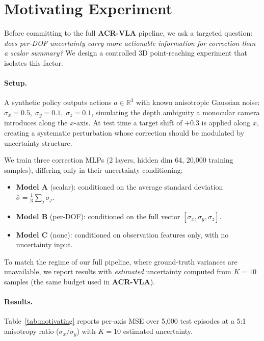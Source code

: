 
\section{Motivating Experiment}
\label{sec:motivating}

Before committing to the full \textbf{ACR-VLA} pipeline, we ask a targeted question: \emph{does per-DOF uncertainty carry more actionable information for correction than a scalar summary?}  We design a controlled 3D point-reaching experiment that isolates this factor.

\paragraph{Setup.}
A synthetic policy outputs actions $a\in\mathbb{R}^{3}$ with known anisotropic Gaussian noise: $\sigma_x{=}0.5,\;\sigma_y{=}0.1,\;\sigma_z{=}0.1$, simulating the depth ambiguity a monocular camera introduces along the $x$-axis.  At test time a target shift of $+0.3$ is applied along $x$, creating a systematic perturbation whose correction should be modulated by uncertainty structure.

We train three correction MLPs (2 layers, hidden dim 64, 20{,}000 training samples), differing only in their uncertainty conditioning:
\begin{itemize}[nosep]
  \item \textbf{Model A} (scalar): conditioned on the average standard deviation $\bar{\sigma}=\tfrac{1}{3}\sum_j\sigma_j$.
  \item \textbf{Model B} (per-DOF): conditioned on the full vector $[\sigma_x,\sigma_y,\sigma_z]$.
  \item \textbf{Model C} (none): conditioned on observation features only, with no uncertainty input.
\end{itemize}
To match the regime of our full pipeline, where ground-truth variances are unavailable, we report results with \emph{estimated} uncertainty computed from $K{=}10$ samples (the same budget used in \textbf{ACR-VLA}).

\paragraph{Results.}
Table~\ref{tab:motivating} reports per-axis MSE over 5{,}000 test episodes at a 5:1 anisotropy ratio ($\sigma_x/\sigma_y$) with $K{=}10$ estimated uncertainty.

